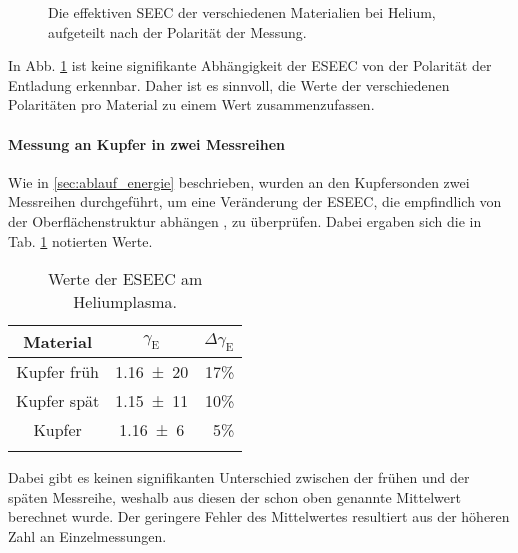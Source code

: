 \begin{figure}[h]
	\centering
	
	\caption{Die effektiven SEEC der verschiedenen Materialien bei Helium, aufgeteilt nach der Polarität der Messung.}
	\label{fig:eseec}
\end{figure}

In Abb. \ref{fig:eseec} ist keine signifikante Abhängigkeit der ESEEC von der Polarität der Entladung erkennbar. Daher ist es sinnvoll, die Werte der verschiedenen Polaritäten pro Material zu einem Wert zusammenzufassen.

\paragraph{Messung an Kupfer in zwei Messreihen }
Wie in \ref{sec:ablauf_energie} beschrieben, wurden an den Kupfersonden zwei Messreihen durchgeführt, um eine Veränderung der ESEEC, die empfindlich von der Oberflächenstruktur abhängen \cite{phelpsColdcathodeDischargesBreakdown1999}, zu überprüfen. Dabei ergaben sich die in Tab. \ref{tab:ESEEC_Cu} notierten Werte.


\begin{table}[thb]
	\centering
	\begin{tabular}{ccr}
	
	{Material} &{$ \gamma_\text{E} $}& \multicolumn{1}{l}{$ \Delta\gamma_\text{E} $} \\
	\toprule
	
	{Kupfer früh}      & \num{1,16(20)} & 17\%  \\
	{Kupfer spät}      & \num{1,15(11)} & 10\%  \\
	{Kupfer}      & \num{1,16(6)} & 5\%  \\
	\addlinespace
	
	\end{tabular}

	\caption{Werte der ESEEC am Heliumplasma.}
	\label{tab:ESEEC_Cu}
\end{table}
Dabei gibt es keinen signifikanten Unterschied zwischen der frühen und der späten Messreihe, weshalb aus diesen der schon oben genannte Mittelwert berechnet wurde. Der geringere Fehler des Mittelwertes resultiert aus der höheren Zahl an Einzelmessungen.